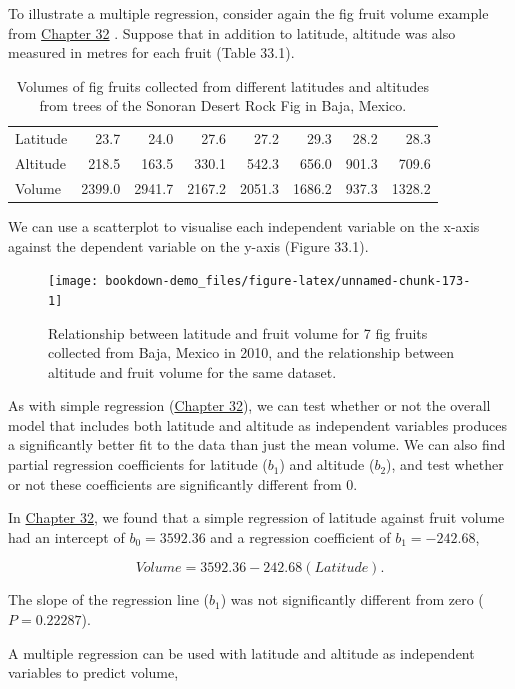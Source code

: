 \documentclass[
]{scrbook}
\begin{document}
To illustrate a multiple regression, consider again the fig fruit volume example from \protect\hyperlink{Chapter_32}{Chapter 32} \citep{Duthie2016}.
Suppose that in addition to latitude, altitude was also measured in metres for each fruit (Table 33.1).

\begin{longtable}[]{@{}lrrrrrrr@{}}
\caption{\label{tab:unnamed-chunk-172}Volumes of fig fruits collected from different latitudes and altitudes from trees of the Sonoran Desert Rock Fig in Baja, Mexico.}\tabularnewline
\toprule
\endhead
Latitude & 23.7 & 24.0 & 27.6 & 27.2 & 29.3 & 28.2 & 28.3 \\
Altitude & 218.5 & 163.5 & 330.1 & 542.3 & 656.0 & 901.3 & 709.6 \\
Volume & 2399.0 & 2941.7 & 2167.2 & 2051.3 & 1686.2 & 937.3 & 1328.2 \\
\bottomrule
\end{longtable}

We can use a scatterplot to visualise each independent variable on the x-axis against the dependent variable on the y-axis (Figure 33.1).

\begin{figure}
\texttt{[image: bookdown-demo\_files/figure-latex/unnamed-chunk-173-1]} \caption{Relationship between latitude and fruit volume for 7 fig fruits collected from Baja, Mexico in 2010, and the relationship between altitude and fruit volume for the same dataset. }\label{fig:unnamed-chunk-173}
\end{figure}

As with simple regression (\protect\hyperlink{Chapter_32}{Chapter 32}), we can test whether or not the overall model that includes both latitude and altitude as independent variables produces a significantly better fit to the data than just the mean volume.
We can also find partial regression coefficients for latitude (\(b_{1}\)) and altitude (\(b_{2}\)), and test whether or not these coefficients are significantly different from 0.

In \protect\hyperlink{Chapter_32}{Chapter 32}, we found that a simple regression of latitude against fruit volume had an intercept of \(b_{0} = 3592.36\) and a regression coefficient of \(b_{1} = -242.68\),

\[Volume = 3592.36 - 242.68(Latitude).\]

The slope of the regression line (\(b_{1}\)) was not significantly different from zero (\(P = 0.22287\)).

A multiple regression can be used with latitude and altitude as independent variables to predict volume,
\end{document}
